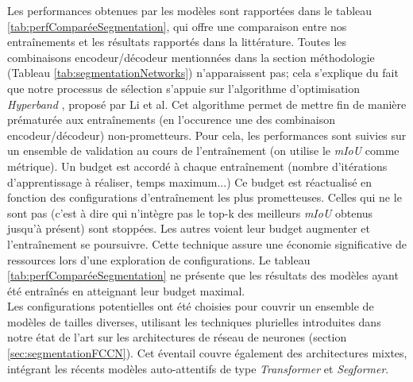  Les performances obtenues par les modèles sont rapportées dans le tableau \ref{tab:perfComparéeSegmentation}, qui offre une comparaison entre nos entraînements et les résultats rapportés dans la littérature. Toutes les combinaisons encodeur/décodeur mentionnées dans la section méthodologie (Tableau \ref{tab:segmentationNetworks}) n'apparaissent pas; cela s'explique du fait que notre processus de sélection s'appuie sur l'algorithme d'optimisation \textit{Hyperband} \cite{liHyperbandNovelBanditBased2018}, proposé par Li et al. Cet algorithme permet de mettre fin de manière prématurée aux entraînements (en l'occurence une des combinaison encodeur/décodeur) non-prometteurs. Pour cela, les performances sont suivies sur un ensemble de validation au cours de l'entraînement (on utilise le \textit{mIoU} comme métrique). Un budget est accordé à chaque entraînement (nombre d'itérations d'apprentissage à réaliser, temps maximum...) Ce budget est réactualisé en fonction des configurations d'entraînement les plus prometteuses. Celles qui ne le sont pas (c'est à dire qui n'intègre pas le top-k des meilleurs \textit{mIoU} obtenus jusqu'à présent) sont stoppées. Les autres voient leur budget augmenter et l'entraînement se poursuivre. Cette technique assure une économie significative de ressources lors d'une exploration de configurations. Le tableau \ref{tab:perfComparéeSegmentation} ne présente que les résultats des modèles ayant été entraînés en atteignant leur budget maximal.
\\
Les configurations potentielles ont été choisies pour couvrir un ensemble de modèles de tailles diverses, utilisant les techniques plurielles introduites dans notre état de l'art sur les architectures de réseau de neurones (section \ref{sec:segmentationFCCN}). Cet éventail couvre également des architectures mixtes, intégrant les récents modèles auto-attentifs de type \textit{Transformer} et \textit{Segformer}.

